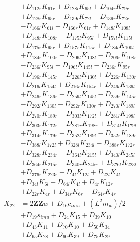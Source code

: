 \begin{multicols}{2}
\begin{align}
&+ D_{112r}K_{61r} + D_{128l}K_{65l} + D_{104r}K_{79r}  \nonumber \\
&+ D_{128r}K_{65r} - D_{139l}K_{72l} - D_{139r}K_{72r}  \nonumber \\
&- D_{166l}K_{61l} - D_{166r}K_{61r} + D_{148l}K_{108l}  \nonumber \\
&+ D_{148r}K_{108r} + D_{175l}K_{95l} + D_{157l}K_{115l}  \nonumber \\
&+ D_{175r}K_{95r} + D_{157r}K_{115r} + D_{184l}K_{100l}  \nonumber \\
&+ D_{184r}K_{100r} - D_{206l}K_{108l} - D_{206r}K_{108r}  \nonumber \\
&- D_{236l}K_{95l} + D_{196l}K_{145l} - D_{236r}K_{95r}  \nonumber \\
&+ D_{196r}K_{145r} + D_{226l}K_{130l} + D_{226r}K_{130r}  \nonumber \\
&+ D_{216l}K_{154l} + D_{216r}K_{154r} + D_{246l}K_{136l}  \nonumber \\
&+ D_{246r}K_{136r} - D_{259l}K_{145l} - D_{259r}K_{145r}  \nonumber \\
&- D_{292l}K_{130l} - D_{292r}K_{130r} + D_{270l}K_{189l}  \nonumber \\
&+ D_{270r}K_{189r} + D_{303l}K_{172l} + D_{281l}K_{198l}  \nonumber \\
&+ D_{303r}K_{172r} + D_{281r}K_{198r} + D_{314l}K_{179l}  \nonumber \\
&+ D_{314r}K_{179r} - D_{352l}K_{189l} - D_{352r}K_{189r}  \nonumber \\
&- D_{388l}K_{172l} + D_{328l}K_{234l} - D_{388r}K_{172r}  \nonumber \\
&+ D_{328r}K_{234r} + D_{364l}K_{215l} + D_{340l}K_{245l}  \nonumber \\
&+ D_{364r}K_{215r} + D_{340r}K_{245r} + D_{376l}K_{223l}  \nonumber \\
&+ D_{376r}K_{223r} + D_{4l}K_{12l} + D_{22l}K_{4l}  \nonumber \\
&+ D_{34l}K_{6l} - D_{64l}K_{4l} + D_{4r}K_{12r}  \nonumber \\
&+ D_{22r}K_{4r} + D_{34r}K_{6r} - D_{64r}K_{4r} \nonumber \\
X_{22} &= 2\mathbf{ZZ}w + D_{16}c_{imu} + (L^2m_w)/2  \nonumber \\
&+ D_{19}s_{imu} + D_{24}K_{15} + D_{39}K_{10}  \nonumber \\
&+ D_{43}K_{11} + D_{70}K_{10} + D_{50}K_{34}  \nonumber \\
&+ D_{65}K_{28} + D_{60}K_{39} + D_{75}K_{29}  \nonumber \\

\end{align}
\end{multicols}
